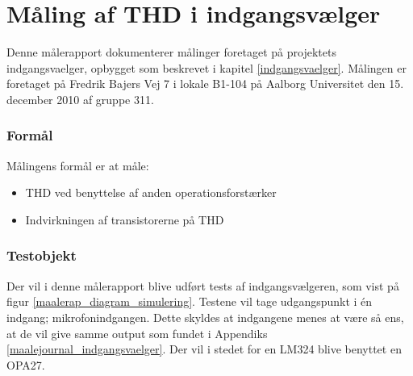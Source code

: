 \chapter{Måling af THD i indgangsvælger}
\label{maalejournal_indgangsvaelger_2}

Denne målerapport dokumenterer målinger foretaget på projektets indgangsvaelger, opbygget som beskrevet i kapitel \ref{indgangsvaelger}. Målingen er foretaget på Fredrik Bajers Vej 7 i lokale B1-104 på Aalborg Universitet den 15. december 2010 af gruppe 311.

\subsection*{Formål}
Målingens formål er at måle:
\begin{itemize}
\item THD ved benyttelse af anden operationsforstærker
\item Indvirkningen af transistorerne på THD
\end{itemize}

\subsection*{Testobjekt}
Der vil i denne målerapport blive udført tests af indgangsvælgeren, som vist på figur \ref{maalerap_diagram_simulering}. Testene vil tage udgangspunkt i én indgang; mikrofonindgangen. Dette skyldes at indgangene menes at være så ens, at de vil give samme output som fundet i Appendiks \ref{maalejournal_indgangsvaelger}. Der vil i stedet for en LM324 blive benyttet en OPA27.

